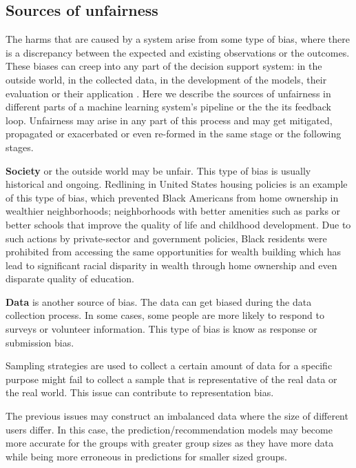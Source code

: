     \subsection{Sources of unfairness}
    The harms that are caused by a system arise from some type of bias, where there is a discrepancy between the expected and existing observations or the outcomes. These biases can creep into any part of the decision support system: in the outside world, in the collected data, in the development of the models, their evaluation or their application \cite{sureshframework2019}. Here we describe the sources of unfairness in different parts of a machine learning system's pipeline or the the its feedback loop. Unfairness may arise in any part of this process and may get mitigated, propagated or exacerbated or even re-formed in the same stage or the following stages.
    
    
    \textbf{Society} or the outside world may be unfair. This type of bias is usually historical and ongoing. Redlining in United States housing policies \cite{rothstein2017color} is an example of this type of bias, which prevented Black Americans from home ownership in wealthier neighborhoods; neighborhoods with better amenities such as parks or better schools that improve the quality of life and childhood development. Due to such actions by private-sector and government policies, Black residents were prohibited from accessing the same opportunities for wealth building which has lead to significant racial disparity in wealth through home ownership and even disparate quality of education.
    
    \textbf{Data} is another source of bias. The data can get biased during the data collection process. In some cases, some people are more likely to respond to surveys or volunteer information. This type of bias is know as response or submission bias. 
    
    Sampling strategies are used to collect a certain amount of data for a specific purpose might fail to collect a sample that is representative of the real data or the real world. This issue can contribute to representation bias.
    
    The previous issues may construct an imbalanced data where the size of different users differ. In this case, the prediction/recommendation models may become more accurate for the groups with greater group sizes as they have more data while being more erroneous in predictions for smaller sized groups.
    

